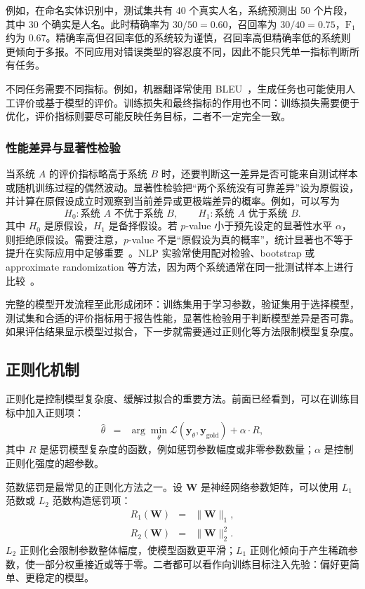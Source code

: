 例如，在命名实体识别中，测试集共有 40 个真实人名，系统预测出 50 个片段，其中 30 个确实是人名。此时精确率为 $30/50=0.60$，召回率为 $30/40=0.75$，$\mathrm{F}_1$ 约为 $0.67$。精确率高但召回率低的系统较为谨慎，召回率高但精确率低的系统则更倾向于多报。不同应用对错误类型的容忍度不同，因此不能只凭单一指标判断所有任务。

不同任务需要不同指标。例如，机器翻译常使用 BLEU~\cite{PapineniEtAl2002BLEU}，生成任务也可能使用人工评价或基于模型的评价。训练损失和最终指标的作用也不同：训练损失需要便于优化，评价指标则要尽可能反映任务目标，二者不一定完全一致。

\subsubsection{性能差异与显著性检验}

当系统 $A$ 的评价指标略高于系统 $B$ 时，还要判断这一差异是否可能来自测试样本或随机训练过程的偶然波动。显著性检验把“两个系统没有可靠差异”设为原假设，并计算在原假设成立时观察到当前差异或更极端差异的概率。例如，可以写为
\[
H_0:\text{系统 }A\text{ 不优于系统 }B,
\qquad
H_1:\text{系统 }A\text{ 优于系统 }B.
\]
其中 $H_0$ 是原假设，$H_1$ 是备择假设。若 $p$-value 小于预先设定的显著性水平 $\alpha$，则拒绝原假设。需要注意，$p$-value 不是“原假设为真的概率”，统计显著也不等于提升在实际应用中足够重要~\cite{McClave-and-Sincich-2006,Freedman-et-al-2007,Freedman:2009}。NLP 实验常使用配对检验、bootstrap 或 approximate randomization 等方法，因为两个系统通常在同一批测试样本上进行比较~\cite{DrorEtAl2018Significance,Dror-et-al:2020}。

完整的模型开发流程至此形成闭环：训练集用于学习参数，验证集用于选择模型，测试集和合适的评价指标用于报告性能，显著性检验用于判断模型差异是否可靠。如果评估结果显示模型过拟合，下一步就需要通过正则化等方法限制模型复杂度。

\subsection{正则化机制}

正则化是控制模型复杂度、缓解过拟合的重要方法。前面已经看到，可以在训练目标中加入正则项：
\begin{eqnarray}
\hat{\theta}
& = &
\arg\min_{\theta}
\mathcal{L}(\mathbf{y}_{\theta},\mathbf{y}_{\mathrm{gold}})
+
\alpha\cdot R,
\end{eqnarray}
\noindent 其中 $R$ 是惩罚模型复杂度的函数，例如惩罚参数幅度或非零参数数量；$\alpha$ 是控制正则化强度的超参数。

范数惩罚是最常见的正则化方法之一。设 $\mathbf{W}$ 是神经网络参数矩阵，可以使用 $L_1$ 范数或 $L_2$ 范数构造惩罚项：
\begin{eqnarray}
R_1(\mathbf{W}) &=& \|\mathbf{W}\|_1,\\
R_2(\mathbf{W}) &=& \|\mathbf{W}\|_2^2.
\end{eqnarray}
$L_2$ 正则化会限制参数整体幅度，使模型函数更平滑；$L_1$ 正则化倾向于产生稀疏参数，使一部分权重接近或等于零。二者都可以看作向训练目标注入先验：偏好更简单、更稳定的模型。

